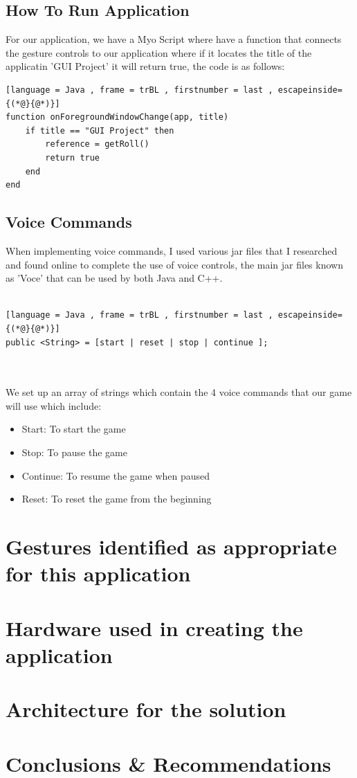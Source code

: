 \documentclass{article}
\begin{document}
\subsection{How To Run Application}

For our application, we have a Myo Script where have a function that connects the gesture controls to our application where if it locates the title of the applicatin 'GUI Project' it will return true, the code is as follows:

\begin{lstlisting}[language = Java , frame = trBL , firstnumber = last , escapeinside={(*@}{@*)}]
function onForegroundWindowChange(app, title)
    if title == "GUI Project" then
        reference = getRoll()
        return true
    end 
end
\end{lstlisting}

\subsection{Voice Commands}

When implementing voice commands, I used various jar files that I researched and found online to complete the use of voice controls, the main jar files known as 'Voce' that can be used by both Java and C++.\\ \\

\begin{lstlisting}[language = Java , frame = trBL , firstnumber = last , escapeinside={(*@}{@*)}]
public <String> = [start | reset | stop | continue ];
\end{lstlisting}
\\ \\
We set up an array of strings which contain the 4 voice commands that our game will use which include:

\begin{itemize}
    \item Start: To start the game
    \item Stop: To pause the game
    \item Continue: To resume the game when paused
    \item Reset: To reset the game from the beginning
\end{itemize}

\section{Gestures identified as appropriate for this application}

\section{Hardware used in creating the application}

\section{Architecture for the solution}

\section{Conclusions \& Recommendations}
\end{document}
